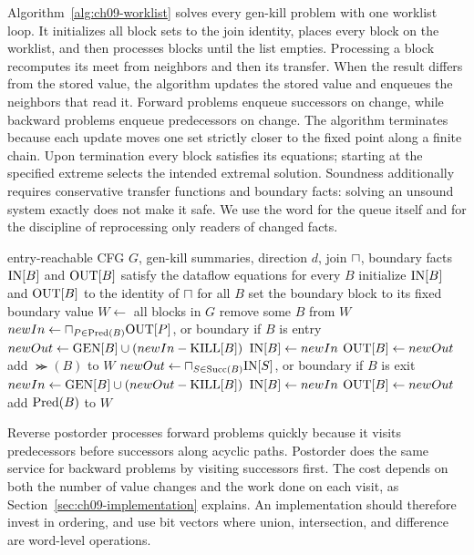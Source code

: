 Algorithm~\ref{alg:ch09-worklist} solves every gen-kill problem with one worklist loop.
It initializes all block sets to the join identity, places every block on the worklist, and then processes blocks until the list empties.
Processing a block recomputes its meet from neighbors and then its transfer.
When the result differs from the stored value, the algorithm updates the stored value and enqueues the neighbors that read it.
Forward problems enqueue successors on change, while backward problems enqueue predecessors on change.
The algorithm terminates because each update moves one set strictly closer to the fixed point along a finite chain.
Upon termination every block satisfies its equations; starting at the specified extreme selects the intended extremal solution.
Soundness additionally requires conservative transfer functions and boundary facts: solving an unsound system exactly does not make it safe.
We use the word  for the queue itself and for the discipline of reprocessing only readers of changed facts.

\begin{algorithm}
\caption{Worklist iterative dataflow for gen-kill problems}\label{alg:ch09-worklist}
\begin{pseudocode}
\Require entry-reachable CFG $G$, gen-kill summaries, direction $d$, join $\sqcap$, boundary facts
\Ensure $\mathrm{IN}[B]$ and $\mathrm{OUT}[B]$ satisfy the dataflow equations for every $B$
\State initialize $\mathrm{IN}[B]$ and $\mathrm{OUT}[B]$ to the identity of $\sqcap$ for all $B$
\State set the boundary block to its fixed boundary value
\State $W \gets$ all blocks in $G$
\State remove some $B$ from $W$
\State $newIn \gets \sqcap_{P \in \operatorname{Pred}(B)} \mathrm{OUT}[P]$, or boundary if $B$ is entry
\State $newOut \gets \mathrm{GEN}[B] \cup (newIn - \mathrm{KILL}[B])$
\State $\mathrm{IN}[B] \gets newIn$
\State $\mathrm{OUT}[B] \gets newOut$
\State add $\Succ(B)$ to $W$
\EndIf
\Else
\State $newOut \gets \sqcap_{S \in \operatorname{Succ}(B)} \mathrm{IN}[S]$, or boundary if $B$ is exit
\State $newIn \gets \mathrm{GEN}[B] \cup (newOut - \mathrm{KILL}[B])$
\State $\mathrm{IN}[B] \gets newIn$
\State $\mathrm{OUT}[B] \gets newOut$
\State add $\operatorname{Pred}(B)$ to $W$
\EndIf
\EndIf
\EndWhile
\end{pseudocode}
\end{algorithm}

Reverse postorder processes forward problems quickly because it visits predecessors before successors along acyclic paths.
Postorder does the same service for backward problems by visiting successors first.
The cost depends on both the number of value changes and the work done on each visit, as Section~\ref{sec:ch09-implementation} explains.
An implementation should therefore invest in ordering, and use bit vectors where union, intersection, and difference are word-level operations.

